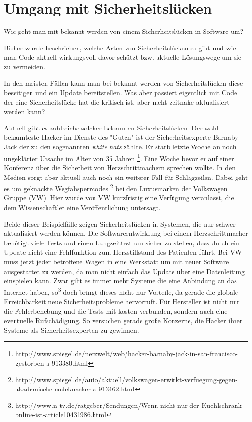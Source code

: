 \section{Umgang mit Sicherheitslücken}
Wie geht man mit bekannt werden von einem Sicherheitslücken in Software um?

Bisher wurde beschrieben, welche Arten von Sicherheitslücken es gibt und 
wie man Code aktuell wirkungsvoll davor schützt bzw. aktuelle Lösungswege 
um sie zu vermeiden.

In den meisten Fällen kann man bei bekannt werden von Sicherheitslücken
diese beseitigen und ein Update bereitstellen.
Was aber passiert eigentlich mit Code der eine Sicherheitslücke hat die
kritisch ist, aber nicht zeitnahe aktualisiert werden kann?

Aktuell gibt es zahlreiche solcher bekannten Sicherheitslücken. Der wohl 
bekannteste Hacker im Dienste des "Guten" ist der Sicherheitsexperte 
Barnaby Jack der zu den sogenannten \textit{white hats} zählte. Er starb 
letzte Woche an noch ungeklärter Ursache im Alter von 35 Jahren
\footnote{http://www.spiegel.de/netzwelt/web/hacker-barnaby-jack-in-san-francisco-gestorben-a-913380.html}. 
Eine Woche bevor er auf einer Konferenz über die Sicherheit von 
Herzschrittmachern sprechen wollte.
In den Medien sorgt aber aktuell auch noch ein weiterer Fall für Schlagzeilen.
Dabei geht es um geknackte Wegfahsperrcodes
\footnote{http://www.spiegel.de/auto/aktuell/volkswagen-erwirkt-verfuegung-gegen-akademische-codeknacker-a-913462.html} 
bei den Luxusmarken der Volkswagen Gruppe (VW).
Hier wurde von VW kurzfristig eine Verfügung veranlasst, die dem Wissenschaftler
eine Veröffentlichung untersagt.

Beide dieser Beispielfälle zeigen Sicherheitslücken in Systemen, die
nur schwer aktualisiert werden können. 
Die Softwareentwicklung bei einem Herzschrittmacher benötigt viele
Tests und einen Langzeittest um sicher zu stellen, dass durch ein Update
nicht eine Fehlfunktion zum Herzstillstand des Patienten führt. 
Bei VW muss jetzt jeder betroffene Wagen in eine Werkstatt um mit neuer
Software ausgestattet zu werden, da man nicht einfach das Update über 
eine Datenleitung einspielen kann. 
Zwar gibt es immer mehr Systeme die eine Anbindung an das Internet haben,
so\footnote{http://www.n-tv.de/ratgeber/Sendungen/Wenn-nicht-nur-der-Kuehlschrank-online-ist-article10431986.html}
doch bringt dieses nicht nur Vorteile, da gerade die globale Erreichbarkeit
neue Sicherheitsprobleme hervorruft.  
Für Hersteller ist nicht nur die Fehlerbehebung und die Tests mit 
kosten verbunden, sondern auch eine eventuelle Rufschädigung. So versuchen
gerade große Konzerne, die Hacker ihrer Systeme als Sicherheitsexperten 
zu gewinnen.

